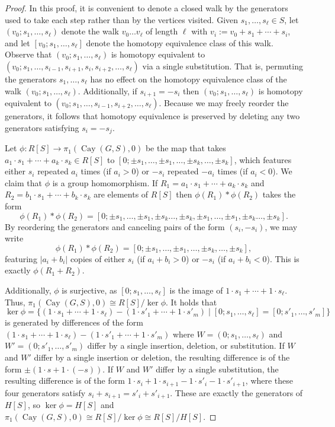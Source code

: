 \documentclass[12pt,letterpaper]{amsart}
\theoremstyle{definition}
\theoremstyle{remark}
\DeclareMathOperator{\Cay}{Cay}
\begin{document}
\begin{proof}
In this proof, it is convenient to denote a closed walk by the generators used to take each step rather than by the vertices visited. Given $s_1,\ldots,s_\ell\in S$, let $(v_0;s_1,\ldots, s_\ell)$ denote the walk $v_0\dots v_\ell$ of length $\ell$ with $v_i:=v_0+s_1+\cdots+s_i$, and let $[v_0;s_1,\ldots,s_\ell]$ denote the homotopy equivalence class of this walk. 
Observe that $(v_0;s_1,\dots, s_\ell)$ is homotopy equivalent to $(v_0;s_1,\dots,s_{i-1},s_{i+1},s_i,s_{i+2},\dots,s_\ell)$ via a single substitution. That is, permuting the generators $s_1,\ldots,s_\ell$ has no effect on the homotopy equivalence class of the walk $(v_0;s_1,\ldots,s_\ell)$.
Additionally, if $s_{i+1}=-s_i$ then $(v_0;s_1,\dots,s_\ell)$ is homotopy equivalent to $(v_0;s_1,\ldots,s_{i-1},s_{i+2},\dots,s_\ell)$. Because we may freely reorder the generators, it follows that homotopy equivalence is preserved by deleting any two generators satisfying $s_i=-s_j$.

Let $\phi:R[S]\to\pi_1(\Cay(G,S),0)$ be the map that takes $a_1\cdot s_1+\cdots+a_k\cdot s_k\in R[S]$ to $[0;\pm s_1,\ldots,\pm s_1,\ldots,\pm s_k,\ldots,\pm s_k]$, which features either $s_i$ repeated $a_i$ times (if $a_i>0$) or $-s_i$ repeated $-a_i$ times (if $a_i<0$). We claim that $\phi$ is a group homomorphism. If $R_1=a_1\cdot s_1+\cdots+a_k\cdot s_k$ and $R_2=b_1\cdot s_1+\cdots +b_k\cdot s_k$ are elements of $R[S]$ then $\phi(R_1)*\phi(R_2)$ takes the form
$$\phi(R_1)*\phi(R_2)=[0;\pm s_1,\ldots,\pm s_1,\pm s_k\ldots,\pm s_k,\pm s_1,\ldots,\pm s_1,\pm s_k\ldots,\pm s_k].$$
By reordering the generators and canceling pairs of the form $(s_i,-s_i)$, we may write
\[
\phi(R_1)*\phi(R_2)=[0;\pm s_1,\ldots,\pm s_1,\ldots,\pm s_k,\ldots,\pm s_k],
\]
featuring $|a_i+b_i|$ copies of either $s_i$ (if $a_i+b_i>0$) or $-s_i$ (if $a_i+b_i<0$). This is exactly $\phi(R_1+R_2)$.

Additionally, $\phi$ is surjective, as $[0;s_1,\ldots,s_\ell]$ is the image of $1\cdot s_1+\cdots+1\cdot s_\ell$. Thus, $\pi_1(\Cay(G,S),0)\cong R[S]/\ker\phi$. It holds that
\[
\ker\phi=\{(1\cdot s_1+\cdots+1\cdot s_\ell)-(1\cdot s'_1+\cdots+1\cdot s'_m) \mid [0;s_1,\ldots,s_\ell]=[0;s'_1,\ldots,s'_m]\}
\]
is generated by differences of the form $(1\cdot s_1+\cdots +1\cdot s_\ell)-(1\cdot s'_1+\cdots+1\cdot s'_m)$ where $W=(0;s_1,\ldots,s_\ell)$ and $W'=(0;s'_1,\ldots,s'_m)$ differ by a single insertion, deletion, or substitution. If $W$ and $W'$ differ by a single insertion or deletion, the resulting difference is of the form $\pm(1\cdot s+1\cdot (-s))$. If $W$ and $W'$ differ by a single substitution, the resulting difference is of the form $1\cdot s_i+1\cdot s_{i+1}-1\cdot s'_i-1\cdot s'_{i+1}$, where these four generators satisfy $s_i+s_{i+1}=s'_i+s'_{i+1}$.
These are exactly the generators of $H[S]$, so $\ker\phi=H[S]$ and $\pi_1(\Cay(G,S),0)\cong R[S]/\ker\phi\cong R[S]/H[S]$.
\end{proof}
\end{document}
